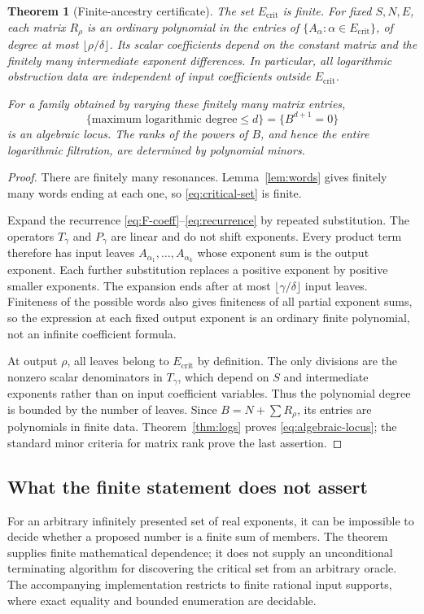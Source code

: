 \documentclass[11pt,a4paper]{article}
\numberwithin{equation}{section}
\newtheorem{theorem}{Theorem}[section]
\theoremstyle{definition}
\theoremstyle{remark}
\begin{document}
\begin{theorem}[Finite-ancestry certificate]\label{thm:ancestry}
The set $E_{\mathrm{crit}}$ is finite. For fixed $S,N,E$, each matrix
$R_\rho$ is an ordinary polynomial in the entries of
$\{A_\alpha:\alpha\in E_{\mathrm{crit}}\}$, of degree at most
$\lfloor\rho/\delta\rfloor$. Its scalar coefficients depend on the
constant matrix and the finitely many intermediate exponent differences.
In particular, all logarithmic obstruction data are independent of input
coefficients outside $E_{\mathrm{crit}}$.

For a family obtained by varying these finitely many matrix entries,
\begin{equation}\label{eq:algebraic-locus}
 \{\text{maximum logarithmic degree}\leq d\}
       =\{B^{d+1}=0\}
\end{equation}
is an algebraic locus. The ranks of the powers of $B$, and hence the entire
logarithmic filtration, are determined by polynomial minors.
\end{theorem}
\begin{proof}
There are finitely many resonances. Lemma~\ref{lem:words} gives finitely
many words ending at each one, so \eqref{eq:critical-set} is finite.

Expand the recurrence \eqref{eq:F-coeff}--\eqref{eq:recurrence} by
repeated substitution. The operators $T_\gamma$ and $P_\gamma$ are
linear and do not shift exponents. Every product term therefore has input
leaves $A_{\alpha_1},\ldots,A_{\alpha_k}$ whose exponent sum is the
output exponent. Each further substitution replaces a positive exponent
by positive smaller exponents. The expansion ends after at most
$\lfloor\gamma/\delta\rfloor$ input leaves. Finiteness of the possible
words also gives finiteness of all partial exponent sums, so the expression
at each fixed output exponent is an ordinary finite polynomial, not an
infinite coefficient formula.

At output $\rho$, all leaves belong to $E_{\mathrm{crit}}$ by
definition. The only divisions are the nonzero scalar denominators in
$T_\gamma$, which depend on $S$ and intermediate exponents rather than on
input coefficient variables. Thus the polynomial degree is bounded by the
number of leaves. Since $B=N+\sum R_\rho$, its entries are polynomials in
finite data. Theorem~\ref{thm:logs} proves \eqref{eq:algebraic-locus};
the standard minor criteria for matrix rank prove the last assertion.
\end{proof}

\subsection{What the finite statement does not assert}
For an arbitrary infinitely presented set of real exponents, it can be
impossible to decide whether a proposed number is a finite sum of members.
The theorem supplies finite mathematical dependence; it does not supply an
unconditional terminating algorithm for discovering the critical set from
an arbitrary oracle. The accompanying implementation restricts to finite
rational input supports, where exact equality and bounded enumeration are
decidable.
\end{document}
